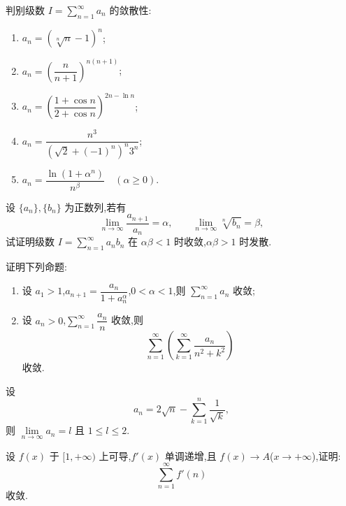 \documentclass[../../数学分析培优讲义.tex]{subfiles}
\begin{document}
\begin{example}
判别级数 $\displaystyle I=\sum\limits_{n=1}^{\infty}a_n$ 的敛散性:
\begin{enumerate}[label=(\arabic*)]
    \item $\displaystyle a_n=(\sqrt[n]{n}-1)^n$;
    \item $\displaystyle a_n=\left(\dfrac{n}{n+1}\right)^{n(n+1)}$;
    \item $\displaystyle a_n=\left(\dfrac{1+\cos n}{2+\cos n}\right)^{2n-\ln n}$;
    \item $\displaystyle a_n=\dfrac{n^3}{(\sqrt2+(-1)^n)^n3^n}$;
    \item $\displaystyle a_n=\dfrac{\ln(1+\alpha^n)}{n^\beta}\quad(\alpha\geq0)$.
\end{enumerate}
\end{example}
\exampleblank

\begin{example}
设 $\{a_n\},\{b_n\}$ 为正数列,若有
\[
    \lim\limits_{n\to\infty}\dfrac{a_{n+1}}{a_n}=\alpha,
    \qquad
    \lim\limits_{n\to\infty}\sqrt[n]{b_n}=\beta,
\]
试证明级数 $\displaystyle I=\sum\limits_{n=1}^{\infty}a_nb_n$ 在 $\alpha\beta<1$ 时收敛,$\alpha\beta>1$ 时发散.
\end{example}
\exampleblank




\begin{example}
证明下列命题:
\begin{enumerate}[label=(\arabic*)]
    \item 设 $a_1>1$,$\displaystyle a_{n+1}=\dfrac{a_n}{1+a_n^\alpha}$,$0<\alpha<1$,则 $\displaystyle\sum\limits_{n=1}^{\infty}a_n$ 收敛;
    \item 设 $a_n>0$,$\displaystyle\sum\limits_{n=1}^{\infty}\dfrac{a_n}{n}$ 收敛,则
    \[
        \sum\limits_{n=1}^{\infty}\left(\sum\limits_{k=1}^{\infty}\dfrac{a_n}{n^2+k^2}\right)
    \]
    收敛.
\end{enumerate}
\end{example}
\exampleblank

\begin{example}
设
\[
    a_n=2\sqrt n-\sum\limits_{k=1}^n\dfrac{1}{\sqrt k},
\]
则 $\displaystyle\lim\limits_{n\to\infty}a_n=l$ 且 $1\leq l\leq2$.
\end{example}
\exampleblank

\begin{example}
设 $f(x)$ 于 $\lbrack 1,+\infty)$ 上可导,$f'(x)$ 单调递增,且 $f(x)\to A$($x\to+\infty$),证明:
\[
    \sum\limits_{n=1}^{\infty}f'(n)
\]
收敛.
\end{example}
\exampleblank
\end{document}
